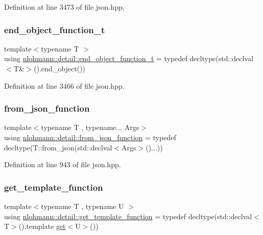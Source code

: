 Definition at line 3473 of file json.\+hpp.

\mbox{\label{namespacenlohmann_1_1detail_af52d6d2521c386998ae940d118182ebc}} 
\subsubsection{\texorpdfstring{end\_object\_function\_t}{end\_object\_function\_t}}
{\footnotesize\ttfamily template$<$typename T $>$ \\
using \mbox{\hyperlink{namespacenlohmann_1_1detail_af52d6d2521c386998ae940d118182ebc}{nlohmann\+::detail\+::end\+\_\+object\+\_\+function\+\_\+t}} = typedef decltype(std\+::declval$<$T\&$>$().end\+\_\+object())}



Definition at line 3466 of file json.\+hpp.

\mbox{\label{namespacenlohmann_1_1detail_a1711ee5cef66a0523055c8d9f024f322}} 
\subsubsection{\texorpdfstring{from\_json\_function}{from\_json\_function}}
{\footnotesize\ttfamily template$<$typename T , typename... Args$>$ \\
using \mbox{\hyperlink{namespacenlohmann_1_1detail_a1711ee5cef66a0523055c8d9f024f322}{nlohmann\+::detail\+::from\+\_\+json\+\_\+function}} = typedef decltype(T\+::from\+\_\+json(std\+::declval$<$Args$>$()...))}



Definition at line 943 of file json.\+hpp.

\mbox{\label{namespacenlohmann_1_1detail_ab4d22cdb6521ee3508db496dea66711e}} 
\subsubsection{\texorpdfstring{get\_template\_function}{get\_template\_function}}
{\footnotesize\ttfamily template$<$typename T , typename U $>$ \\
using \mbox{\hyperlink{namespacenlohmann_1_1detail_ab4d22cdb6521ee3508db496dea66711e}{nlohmann\+::detail\+::get\+\_\+template\+\_\+function}} = typedef decltype(std\+::declval$<$T$>$().template \mbox{\hyperlink{namespacenlohmann_1_1detail_acc422c11342b31368f610b6f96fcedc6}{get}}$<$U$>$())}



